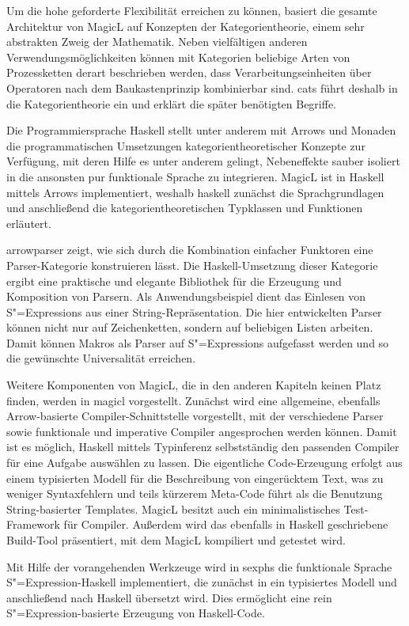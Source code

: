 \documentclass[12pt, a4paper, bibgerm]{scrbook}
\newcommand\cref{}
\newcommand{\sexp}{S"=Expression}
\newcommand{\sexps}{S"=Expressions}
\begin{document}
Um die hohe geforderte Flexibilität erreichen zu können, basiert die
gesamte Architektur von MagicL auf Konzepten der Kategorientheorie,
einem sehr abstrakten Zweig der Mathematik. Neben vielfältigen anderen
Verwendungsmöglichkeiten können mit Kategorien beliebige Arten von
Prozessketten derart beschrieben werden, dass Verarbeitungseinheiten
über Operatoren nach dem Baukastenprinzip kombinierbar sind. \cref{cats}
führt deshalb in die Kategorientheorie ein und erklärt die später
benötigten Begriffe.

Die Programmiersprache Haskell stellt unter anderem mit Arrows und
Monaden die programmatischen Umsetzungen kategorientheoretischer
Konzepte zur Verfügung, mit deren Hilfe es unter anderem gelingt,
Nebeneffekte sauber isoliert in die ansonsten pur funktionale Sprache zu
integrieren. MagicL ist in Haskell mittels Arrows implementiert, weshalb
\cref{haskell} zunächst die Sprachgrundlagen und anschließend die
kategorientheoretischen Typklassen und Funktionen erläutert.

\cref{arrowparser} zeigt, wie sich durch die Kombination einfacher
Funktoren eine Parser-Kategorie konstruieren lässt. Die
Haskell-Umsetzung dieser Kategorie ergibt eine praktische und elegante
Bibliothek für die Erzeugung und Komposition von Parsern. Als
Anwendungsbeispiel dient das Einlesen von \sexps{} aus einer
String-Repräsentation. Die hier entwickelten Parser können nicht nur auf
Zeichenketten, sondern auf beliebigen Listen arbeiten. Damit können
Makros als Parser auf \sexps{} aufgefasst werden und so die
gewünschte Universalität erreichen.

Weitere Komponenten von MagicL, die in den anderen Kapiteln keinen Platz
finden, werden in \cref{magicl} vorgestellt. Zunächst wird eine
allgemeine, ebenfalls Arrow-basierte Compiler-Schnittstelle vorgestellt,
mit der verschiedene Parser sowie funktionale und imperative Compiler
angesprochen werden können. Damit ist es möglich, Haskell mittels
Typinferenz selbstständig den passenden Compiler für eine Aufgabe
auswählen zu lassen.  Die eigentliche Code-Erzeugung erfolgt aus einem
typisierten Modell für die Beschreibung von eingerücktem Text, was zu
weniger Syntaxfehlern und teils kürzerem Meta-Code führt als die
Benutzung String-basierter Templates. MagicL besitzt auch ein
minimalistisches Test-Framework für Compiler. Außerdem wird das
ebenfalls in Haskell geschriebene Build-Tool präsentiert, mit dem MagicL
kompiliert und getestet wird.

Mit Hilfe der vorangehenden Werkzeuge wird in \cref{sexphs} die
funktionale Sprache \sexp{}-Haskell implementiert, die zunächst in ein
typisiertes Modell und anschließend nach Haskell übersetzt wird. Dies
ermöglicht eine rein \sexp{}-basierte Erzeugung von Haskell-Code.
\end{document}
